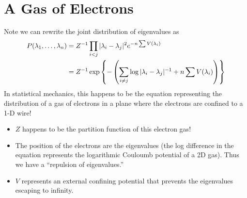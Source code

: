 \section{A Gas of Electrons}
Note we can rewrite the joint distribution of eigenvalues as
\[
    \begin{split}
        P(\lambda_1, \dots, \lambda_n) &= Z^{-1} \prod_{i < j} |\lambda_i-\lambda_j|^2e^{-n\sum V(\lambda_i)}\\
        &= Z^{-1} \exp\left\{- \left( \sum_{i \neq j} \log |\lambda_i-\lambda_j|^{-1} + n \sum V(\lambda_i) \right) \right\}\\
    \end{split}
\]
In statistical mechanics, this happens to be the equation representing the distribution of a gas of electrons in a plane where the electrons are confined to a 1-D wire!
\begin{itemize}
    \item $Z$ happens to be the partition function of this electron gas!
    \item The position of the electrons are the eigenvalues (the log difference in the equation represents the logarithmic Couloumb potential of a 2D gas). Thus we have a ``repulsion of eigenvalues.''
    \item $V$ represents an external confining potential that prevents the eigenvalues escaping to infinity.
\end{itemize}

